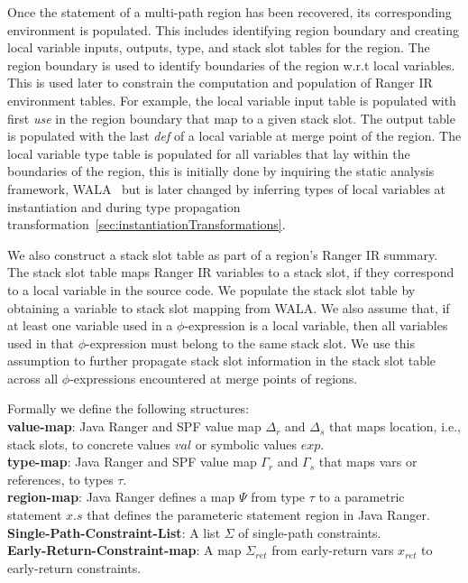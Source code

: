 Once the statement of a multi-path region has been recovered, its corresponding environment is populated.
%
This includes identifying region boundary and creating local variable inputs, outputs, type, and stack slot tables for
the region.
%
The region boundary is used to identify boundaries of the region w.r.t local variables.
%
This is used later to constrain the computation and population of Ranger IR environment tables.
%
For example, the local variable input table is populated with first \textit{use} in the region boundary that map to a given stack slot.
%
The output table is populated with the last \textit{def} of a local variable at merge point of the region.
%
The local variable type table is populated for all variables that lay within the boundaries of the region, this is initially done by
inquiring the static analysis framework, WALA~\cite{Wala} but is later changed by inferring types of local variables
at instantiation and during type propagation transformation~\ref{sec:instantiationTransformations}.

We also construct a stack slot table as part of a region\rq s Ranger IR summary.
%
The stack slot table maps Ranger IR variables to a stack slot, if they correspond to a local variable in the source code.
%
We populate the stack slot table by obtaining a variable to stack slot mapping from WALA.
%
We also assume that, if at least one variable used in a $\phi$-expression is a local variable, then all variables
used in that $\phi$-expression must belong to the same stack slot.
%
We use this assumption to further propagate stack slot information in the stack slot table across all $\phi$-expressions
encountered at merge points of regions.


Formally we define the following structures: \\
\textbf{value-map}: Java Ranger and SPF value map $\Delta_r$ and $\Delta_s$  that maps location, i.e., stack slots, to concrete values $val$ or symbolic values $exp$. \\
\textbf{type-map}: Java Ranger and SPF value map $\Gamma_r$ and $\Gamma_s$  that maps vars or references, to types $\tau$.\\
\textbf{region-map}: Java Ranger defines a map $\Psi$ from type $\tau$  to a parametric statement $x.s$ that defines the parameteric statement region in Java Ranger.\\
\textbf{Single-Path-Constraint-List}: A list $\Sigma$ of single-path constraints.\\
\textbf{Early-Return-Constraint-map}: A map $\Sigma_{ret}$ from early-return vars $x_{ret}$ to early-return constraints.

